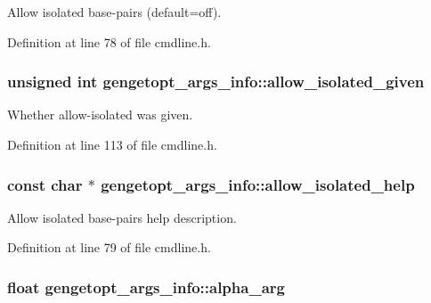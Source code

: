 Allow isolated base-\/pairs (default=off). 



Definition at line 78 of file cmdline.\+h.

\hypertarget{structgengetopt__args__info_a8b05ab428edea135b106a9bcf40344ae}{
\subsubsection[{allow\+\_\+isolated\+\_\+given}]{\setlength{\rightskip}{0pt plus 5cm}unsigned int gengetopt\+\_\+args\+\_\+info\+::allow\+\_\+isolated\+\_\+given}}\label{structgengetopt__args__info_a8b05ab428edea135b106a9bcf40344ae}


Whether allow-\/isolated was given. 



Definition at line 113 of file cmdline.\+h.

\hypertarget{structgengetopt__args__info_accb0df971eca4af7ced072388135ed2b}{
\subsubsection[{allow\+\_\+isolated\+\_\+help}]{\setlength{\rightskip}{0pt plus 5cm}const char $\ast$ gengetopt\+\_\+args\+\_\+info\+::allow\+\_\+isolated\+\_\+help}}\label{structgengetopt__args__info_accb0df971eca4af7ced072388135ed2b}


Allow isolated base-\/pairs help description. 



Definition at line 79 of file cmdline.\+h.

\hypertarget{structgengetopt__args__info_a502d24814b53a2197444e3ef7f5af837}{
\subsubsection[{alpha\+\_\+arg}]{\setlength{\rightskip}{0pt plus 5cm}float gengetopt\+\_\+args\+\_\+info\+::alpha\+\_\+arg}}\label{structgengetopt__args__info_a502d24814b53a2197444e3ef7f5af837}


